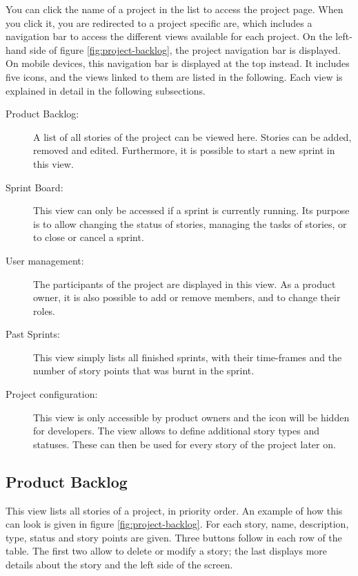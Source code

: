 \documentclass[
	accentcolor=tud1a %
]{tudreport}
\begin{document}
You can click the name of a project in the list to access the project page. When you click it, you are redirected to a project specific are, which includes a navigation bar to access the different views available for each project. On the left-hand side of figure \ref{fig:project-backlog}, the project navigation bar is displayed. On mobile devices, this navigation bar is displayed at the top instead. It includes five icons, and the views linked to them are listed in the following. Each view is explained in detail in the following subsections.
\begin{description}
	\item[Product Backlog:] A list of all stories of the project can be viewed here. Stories can be added, removed and edited. Furthermore, it is possible to start a new sprint in this view.
	\item[Sprint Board:] This view can only be accessed if a sprint is currently running. Its purpose is to allow changing the status of stories, managing the tasks of stories, or to close or cancel a sprint.
	\item[User management:] The participants of the project are displayed in this view. As a product owner, it is also possible to add or remove members, and to change their roles.
	\item[Past Sprints:] This view simply lists all finished sprints, with their time-frames and the number of story points that was burnt in the sprint.
	\item[Project configuration:] This view is only accessible by product owners and the icon will be hidden for developers. The view allows to define additional story types and statuses. These can then be used for every story of the project later on.
\end{description}


\subsection{Product Backlog}
\label{sec:backlog}


This view lists all stories of a project, in priority order. An example of how this can look is given in figure \ref{fig:project-backlog}. For each story, name, description, type, status and story points are given. Three buttons follow in each row of the table. The first two allow to delete or modify a story; the last displays more details about the story and the left side of the screen.
\end{document}
